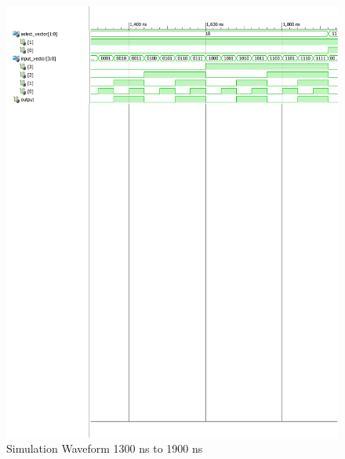 \documentclass{article}
\begin{document}
\begin{figure}[H]
    \centering
    \includegraphics[scale=0.75,cframe=blue 0.5pt 3pt]{6aw-3.pdf}
    \caption{Simulation Waveform 1300 ns to 1900 ns  }
\end{figure}
\end{document}
